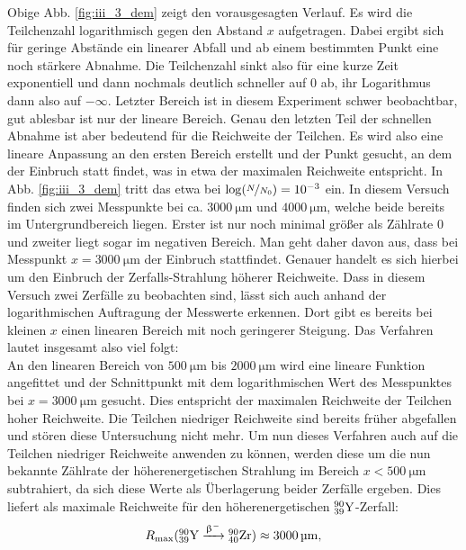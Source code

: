 Obige Abb. \ref{fig:iii_3_dem} zeigt den vorausgesagten Verlauf. Es wird die Teilchenzahl logarithmisch gegen den Abstand $x$ aufgetragen. Dabei ergibt sich für geringe Abstände ein linearer Abfall und ab einem bestimmten Punkt eine noch stärkere Abnahme. Die Teilchenzahl sinkt also für eine kurze Zeit exponentiell und dann nochmals deutlich schneller auf 0 ab, ihr Logarithmus dann also auf $-\infty$. Letzter Bereich ist in diesem Experiment schwer beobachtbar, gut ablesbar ist nur der lineare Bereich. Genau den letzten Teil der schnellen Abnahme ist aber bedeutend für die Reichweite der Teilchen. Es wird also eine lineare Anpassung an den ersten Bereich erstellt und der Punkt gesucht, an dem der Einbruch statt findet, was in etwa der maximalen Reichweite entspricht. In Abb. \ref{fig:iii_3_dem} tritt das etwa bei $\log(\nicefrac{N}{N_0}) = 10^{-3}$ ein. In diesem Versuch finden sich zwei Messpunkte bei ca. $\SI{3000}{\micro\meter}$ und $\SI{4000}{\micro\meter}$, welche beide bereits im Untergrundbereich liegen. Erster ist nur noch minimal größer als Zählrate 0 und zweiter liegt sogar im negativen Bereich. Man geht daher davon aus, dass bei Messpunkt $x=\SI{3000}{\micro\meter}$ der Einbruch stattfindet. Genauer handelt es sich hierbei um den Einbruch der Zerfalls-Strahlung höherer Reichweite. Dass in diesem Versuch zwei Zerfälle zu beobachten sind, lässt sich auch anhand der logarithmischen Auftragung der Messwerte erkennen. Dort gibt es bereits bei kleinen $x$ einen linearen Bereich mit noch geringerer Steigung. Das Verfahren lautet insgesamt also viel folgt:\\
An den linearen Bereich von $\SI{500}{\micro\meter}$ bis $\SI{2000}{\micro\meter}$ wird eine lineare Funktion angefittet und der Schnittpunkt mit dem logarithmischen Wert des Messpunktes bei $x=\SI{3000}{\micro\meter}$ gesucht. Dies entspricht der maximalen Reichweite der Teilchen hoher Reichweite. Die Teilchen niedriger Reichweite sind bereits früher abgefallen und stören diese Untersuchung nicht mehr. Um nun dieses Verfahren auch auf die Teilchen niedriger Reichweite anwenden zu können, werden diese um die nun bekannte Zählrate der höherenergetischen Strahlung im Bereich $x < \SI{500}{\micro\meter}$ subtrahiert, da sich diese Werte als Überlagerung beider Zerfälle ergeben. Dies liefert als maximale Reichweite für den höherenergetischen $\element{Y}{39}{90}$-Zerfall:
\begin{equation}
R_\mathrm{max} (\element{Y}{39}{90} \xrightarrow{\upbeta^-} \element{Zr}{40}{90}) \approx \SI{3000}{\micro\meter},
\end{equation}

